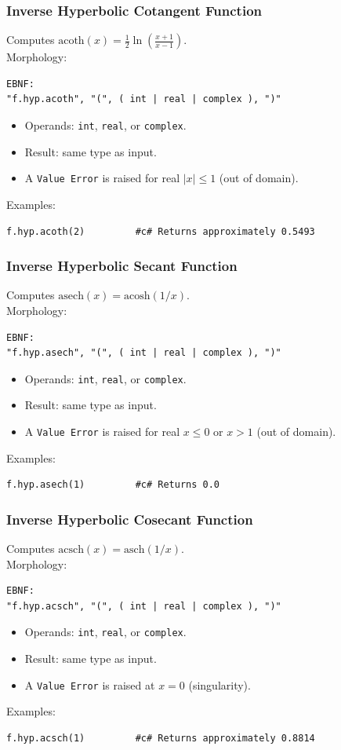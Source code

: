 \subsubsection{Inverse Hyperbolic Cotangent Function}
Computes $\text{acoth}(x) = \frac{1}{2} \ln\!\left(\frac{x+1}{x-1}\right)$. \\
Morphology:
\begin{verbatim}
EBNF:
"f.hyp.acoth", "(", ( int | real | complex ), ")"
\end{verbatim}
\begin{itemize}
\item Operands: \texttt{int}, \texttt{real}, or \texttt{complex}.
\item Result: same type as input.
\item A \texttt{Value Error} is raised for real $|x| \leq 1$ (out of domain).
\end{itemize}
Examples:
\begin{verbatim}
f.hyp.acoth(2)         #c# Returns approximately 0.5493
\end{verbatim}

\subsubsection{Inverse Hyperbolic Secant Function}
Computes $\text{asech}(x) = \text{acosh}(1/x)$. \\
Morphology:
\begin{verbatim}
EBNF:
"f.hyp.asech", "(", ( int | real | complex ), ")"
\end{verbatim}
\begin{itemize}
\item Operands: \texttt{int}, \texttt{real}, or \texttt{complex}.
\item Result: same type as input.
\item A \texttt{Value Error} is raised for real $x \leq 0$ or $x > 1$ (out of domain).
\end{itemize}
Examples:
\begin{verbatim}
f.hyp.asech(1)         #c# Returns 0.0
\end{verbatim}

\subsubsection{Inverse Hyperbolic Cosecant Function}
Computes $\text{acsch}(x) = \text{asch}(1/x)$. \\
Morphology:
\begin{verbatim}
EBNF:
"f.hyp.acsch", "(", ( int | real | complex ), ")"
\end{verbatim}
\begin{itemize}
\item Operands: \texttt{int}, \texttt{real}, or \texttt{complex}.
\item Result: same type as input.
\item A \texttt{Value Error} is raised at $x = 0$ (singularity).
\end{itemize}
Examples:
\begin{verbatim}
f.hyp.acsch(1)         #c# Returns approximately 0.8814
\end{verbatim}

